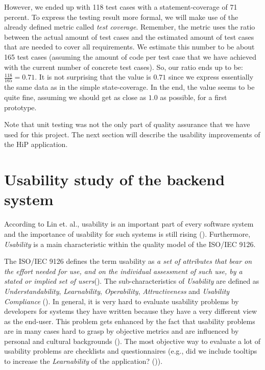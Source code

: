 However, we ended up with 118 test cases with a statement-coverage of 71 percent. To express the testing result more formal, we will make use of the already defined metric called \emph{test coverage}. Remember, the metric  uses the ratio between the actual amount of test cases and the estimated amount of test cases that are needed to cover all requirements. We estimate this number to be about 165 test cases (assuming the amount of code per test case that we have achieved with the current number of concrete test cases). So, our ratio ends up to be: $\frac{118}{165}=0.71$. It is not surprising that the value is $0.71$ since we express essentially the same data as in the simple state-coverage. In the end, the value seems to be quite fine, assuming we should get as close as $1.0$ as possible, for a first prototype.

Note that unit testing was not the only part of quality assurance that we have used for this project. The next section will describe the usability improvements of the \ac{HiP} application.

\section{Usability study of the backend system}
According to Lin et. al., usability is an important part of every software system and the importance of usability for such systems is still rising (\cite{lin1997proposed}). Furthermore, \emph{Usability} is a main characteristic within the quality model of the ISO/IEC 9126.

The ISO/IEC 9126 defines the term usability as \glqq \emph{a set of attributes that bear on the effort needed for use, and on the individual assessment of such use, by a stated or implied set of users}\grqq (\cite{bevan1997quality}). The sub-characteristics of \emph{Usability} are defined as \emph{Understandability}, \emph{Learnability}, \emph{Operability}, \emph{Attractiveness} and \emph{Usability Compliance} (\cite{bevan1997quality}). In general, it is very hard to evaluate usability problems by developers for systems they have written because they have a very different view as the end-user. This problem gets enhanced by the fact that usability problems are in many cases hard to grasp by objective metrics and are influenced by personal and cultural backgrounds (\cite{herman1996towards}). The most objective way to evaluate a lot of usability problems are checklists and questionnaires (e.g., did we include tooltips to increase the \emph{Learnability} of the application? (\cite{shamsuddin2014capturing})). 

